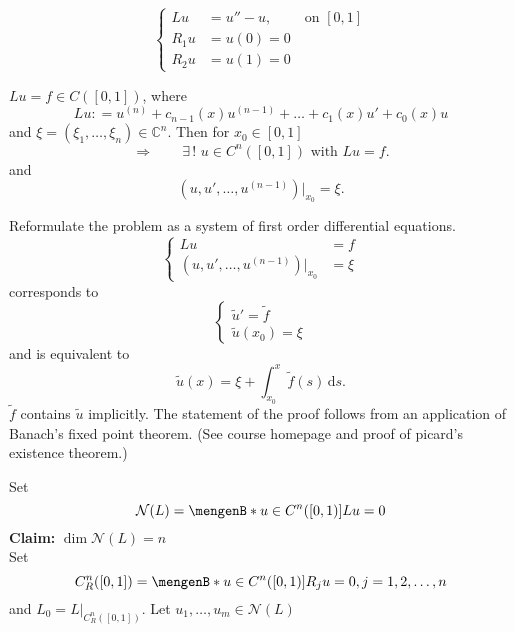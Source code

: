 \begin{beispiel}
	\[
		\begin{cases}
			Lu &= u''-u, \qquad \text{ on }[0,1]\\
			R_1u &=u(0)=0 \\
			R_2u &=u(1)=0
		\end{cases}
	\]
\end{beispiel}
	\begin{theorem}
		$Lu=f \in C([0,1])$, where
		\[
			Lu: = u^{(n)}+ c_{n-1}(x)u^{(n-1)} + \dots + c_1(x)u' + c_0(x)u
		\]
		and $\xi = (\xi_1, \dots, \xi_n) \in \mathbb{C}^n$. Then for $x_0 \in [0,1]$
		\[
			\Rightarrow \qquad \exists\,!\,\,u \in C^n([0,1]) \text{ with } Lu=f.
		\]
		and 
		\[
			(u,u',\dots,u^{(n-1)}) \big|_{x_0}^{} = \xi.
		\]
	\end{theorem}
	\begin{beweis}
		Reformulate the problem as a system of first order differential equations.
	\[
		\begin{cases}
			Lu &=f \\
			(u,u',\dots,u^{(n-1)})  \big|_{x_0}^{} &= \xi
		\end{cases}
	\]
	corresponds to
	\[
		\begin{cases}
			\tilde u' = \tilde f \\
			\tilde u(x_0) = \xi
		\end{cases}
	\]
	and is equivalent to
	\[
		\tilde u(x) = \xi + \int_{x_0}^{x} \tilde f(s) \,\mathrm{d}s.
	\]
	$\tilde f$ contains $\tilde u$ implicitly. The statement of the proof follows from an application of Banach's fixed point theorem. (See course homepage and proof of picard's existence theorem.)
	\end{beweis}
Set 
\[
 	\mathcal{N}(L) = \set[u \in C^n([0,1])]{Lu=0}
\]
\textbf{Claim:} \text{    }$\dim \mathcal{N}(L)=n$ \\
Set \[
	C_R^n([0,1]) = \set[u \in C^n([0,1])]{R_ju = 0, j = 1,2,\dots,n}
\]
and $L_0 = L  \big|_{C^n_R([0,1])}^{}$. Let $u_1,\dots,u_m \in \mathcal{N}(L)$


